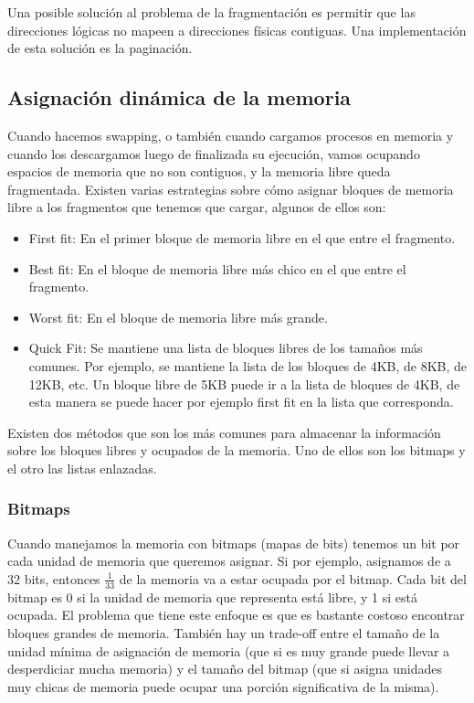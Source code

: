 \documentclass{article}
\begin{document}
Una posible soluci\'on al problema de la fragmentaci\'on es permitir que las direcciones l\'ogicas no mapeen a direcciones f\'isicas contiguas. Una implementaci\'on de esta soluci\'on es la paginaci\'on.

\subsection{Asignaci\'on din\'amica de la memoria}

Cuando hacemos swapping, o tambi\'en cuando cargamos procesos en memoria y cuando los descargamos luego de finalizada su ejecuci\'on, vamos ocupando espacios de memoria que no son contiguos, y la memoria libre queda fragmentada. Existen varias estrategias sobre c\'omo asignar bloques de memoria libre a los fragmentos que tenemos que cargar, algunos de ellos son:

\begin{itemize}
\item First fit: En el primer bloque de memoria libre en el que entre el fragmento.
\item Best fit: En el bloque de memoria libre m\'as chico en el que entre el fragmento.
\item Worst fit: En el bloque de memoria libre m\'as grande.
\item Quick Fit: Se mantiene una lista de bloques libres de los tama\~nos m\'as comunes. Por ejemplo, se mantiene la lista de los bloques de 4KB, de 8KB, de 12KB, etc. Un bloque libre de 5KB puede ir a la lista de bloques de 4KB, de esta manera se puede hacer por ejemplo first fit en la lista que corresponda.
\end{itemize}

Existen dos m\'etodos que son los m\'as comunes para almacenar la informaci\'on sobre los bloques libres y ocupados de la memoria. Uno de ellos son los bitmaps y el otro las listas enlazadas.

\subsubsection{Bitmaps}
Cuando manejamos la memoria con bitmaps (mapas de bits) tenemos un bit por cada unidad de memoria que queremos asignar. Si por ejemplo, asignamos de a 32 bits, entonces $\frac{1}{33}$ de la memoria va a estar ocupada por el bitmap. Cada bit del bitmap es 0 si la unidad de memoria que representa est\'a libre, y 1 si est\'a ocupada. El problema que tiene este enfoque es que es bastante costoso encontrar bloques grandes de memoria. Tambi\'en hay un trade-off entre el tama\~no de la unidad m\'inima de asignaci\'on de memoria (que si es muy grande puede llevar a desperdiciar mucha memoria) y el tama\~no del bitmap (que si asigna unidades muy chicas de memoria puede ocupar una porci\'on significativa de la misma).
 
\end{document}
